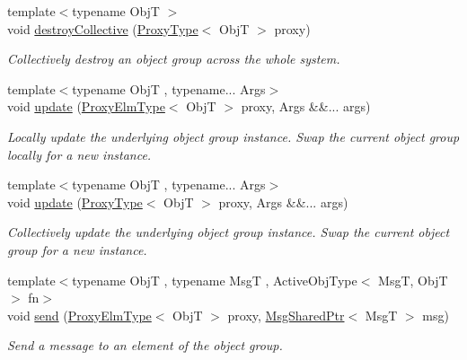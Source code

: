 \begin{DoxyCompactItemize}
{\footnotesize template$<$typename ObjT $>$ }\\void \hyperlink{structvt_1_1objgroup_1_1_obj_group_manager_ad02bff10088a4f8e453cf24bd832308c}{destroy\+Collective} (\hyperlink{structvt_1_1objgroup_1_1_obj_group_manager_aea65eef52f240a52210132eef5ce591f}{Proxy\+Type}$<$ ObjT $>$ proxy)
\begin{DoxyCompactList}\small\item\em Collectively destroy an object group across the whole system. \end{DoxyCompactList}\item 
{\footnotesize template$<$typename ObjT , typename... Args$>$ }\\void \hyperlink{structvt_1_1objgroup_1_1_obj_group_manager_abd0f61b0578a268a27420f2c38e3b12d}{update} (\hyperlink{structvt_1_1objgroup_1_1_obj_group_manager_adba6c8ecb0f4c30e719f1abb995cfc9b}{Proxy\+Elm\+Type}$<$ ObjT $>$ proxy, Args \&\&... args)
\begin{DoxyCompactList}\small\item\em Locally update the underlying object group instance. Swap the current object group locally for a new instance. \end{DoxyCompactList}\item 
{\footnotesize template$<$typename ObjT , typename... Args$>$ }\\void \hyperlink{structvt_1_1objgroup_1_1_obj_group_manager_a36d8749cf4f42e6b912159e9b4f959d6}{update} (\hyperlink{structvt_1_1objgroup_1_1_obj_group_manager_aea65eef52f240a52210132eef5ce591f}{Proxy\+Type}$<$ ObjT $>$ proxy, Args \&\&... args)
\begin{DoxyCompactList}\small\item\em Collectively update the underlying object group instance. Swap the current object group for a new instance. \end{DoxyCompactList}\item 
{\footnotesize template$<$typename ObjT , typename MsgT , Active\+Obj\+Type$<$ Msg\+T, Obj\+T $>$ fn$>$ }\\void \hyperlink{structvt_1_1objgroup_1_1_obj_group_manager_a4b45c347778fda185d97b4c6af4ec58e}{send} (\hyperlink{structvt_1_1objgroup_1_1_obj_group_manager_adba6c8ecb0f4c30e719f1abb995cfc9b}{Proxy\+Elm\+Type}$<$ ObjT $>$ proxy, \hyperlink{namespacevt_ab2b3d506ec8e8d1540aede826d84a239}{Msg\+Shared\+Ptr}$<$ MsgT $>$ msg)
\begin{DoxyCompactList}\small\item\em Send a message to an element of the object group. \end{DoxyCompactList}\item 

\end{DoxyCompactItemize}
